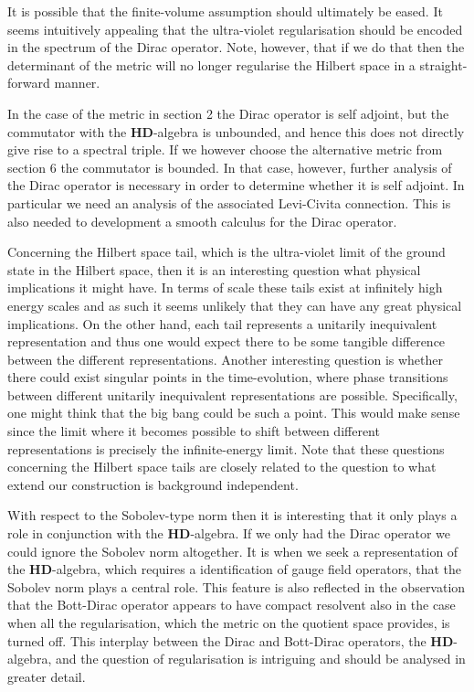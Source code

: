 \documentclass[letterpaper,12pt]{article}
\begin{document}
It is possible that the finite-volume assumption should ultimately be eased. It seems intuitively appealing that the ultra-violet regularisation should be encoded in the spectrum of the Dirac operator. Note, however, that if we do that then the determinant of the metric will no longer regularise the Hilbert space in a straight-forward manner. 


In the case of the metric in section 2 the Dirac operator is self adjoint, but the commutator with the $\mathbf{HD}$-algebra is unbounded, and hence this does not directly give rise to a spectral triple. If we however choose the alternative metric from section 6 the commutator is bounded. In that case, however, further analysis of the Dirac operator is necessary in order to determine whether it is self adjoint. In particular we need an analysis of the associated Levi-Civita connection. This is also needed to development a smooth calculus for the Dirac operator.   


Concerning the Hilbert space tail, which is the ultra-violet limit of the ground state in the Hilbert space, then it is an interesting question what physical implications it might have. In terms of scale these tails exist at infinitely high energy scales and as such it seems unlikely that they can have any great physical implications. On the other hand, each tail represents a unitarily inequivalent representation and thus one would expect there to be some tangible difference between the different representations. Another interesting question is whether there could exist singular points in the time-evolution, where phase transitions between different unitarily inequivalent representations are possible. Specifically, one might think that the big bang could be such a point. This would make sense since the limit where it becomes possible to shift between different representations is precisely the infinite-energy limit. Note that these questions concerning the Hilbert space tails are closely related to the question to what extend our construction is background independent.

With respect to the Sobolev-type norm then it is interesting that it only plays a role in conjunction with the $\mathbf{HD}$-algebra. If we only had the Dirac operator we could ignore the Sobolev norm altogether. It is when we seek a representation of the $\mathbf{HD}$-algebra, which requires a identification of gauge field operators, that the Sobolev norm plays a central role. This feature is also reflected in the observation that the Bott-Dirac operator appears to have compact resolvent also in the case when all the regularisation, which the metric on the quotient space provides, is turned off. This interplay between the Dirac and Bott-Dirac operators, the $\mathbf{HD}$-algebra, and the question of regularisation is intriguing and should be analysed in greater detail.
\end{document}

